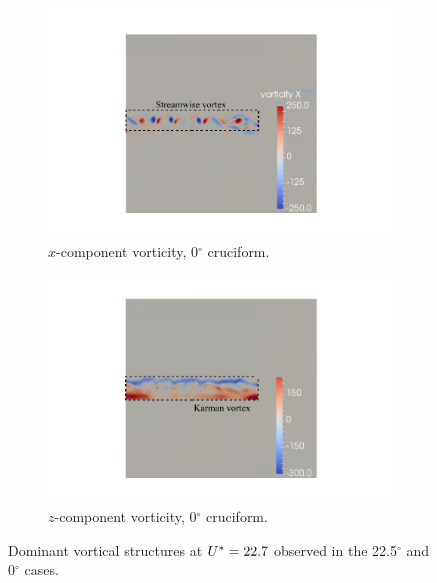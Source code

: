 \documentclass[oneside]{utmthesis}
\begin{document}
\begin{figure} \continuedfloat
  \centering
  \begin{subfigure}[h]{1\textwidth}
    \centering
    \includegraphics[width=\textwidth]{figs/vorx00}
    \caption{$x$-component vorticity, 0$^{\circ}$ cruciform.}
    \label{fig:vorx00}
  \end{subfigure}

  \begin{subfigure}[h]{1\textwidth}
    \centering
    \includegraphics[width=\textwidth]{figs/vorz00}
    \caption{$z$-component vorticity, 0$^{\circ}$ cruciform.}
    \label{fig:vorz00}
  \end{subfigure}

  \caption{Dominant vortical structures at $U^{*} = 22.7$ observed in the 22.5$^{\circ}$ and 0$^{\circ}$ cases.} \label{fig:vortStruct22500}
\end{figure}
\end{document}
